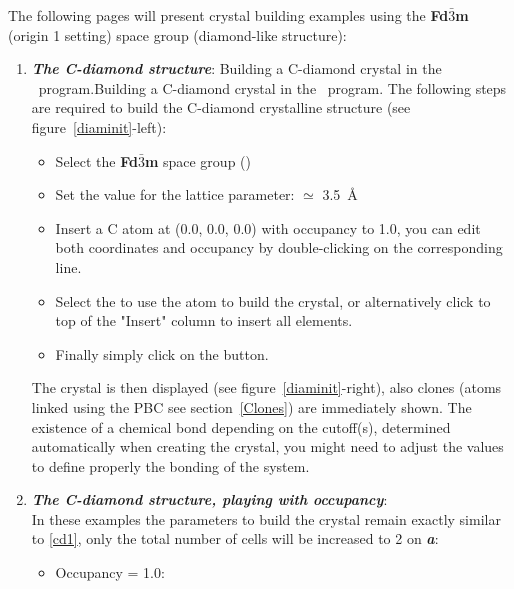 The following pages will present crystal building examples using the {\bf{Fd$\bar{3}$m}} (origin 1 setting) space group (diamond-like structure):\\
\begin{enumerate}
\item\label{cd1} {\bf{\textit{The C-diamond structure}}}:
{Building a C-diamond crystal in the \atomes\ program.}{Building a C-diamond crystal in the \atomes\ program.}
\laf The following steps are required to build the C-diamond crystalline structure (see figure~\ref{diaminit}-left):
\begin{itemize}
\item Select the {\bf{Fd$\bar{3}$m}} space group ()
\item Set the value for the lattice parameter: $\simeq$ 3.5~\AA
\item Insert a C atom at (0.0, 0.0, 0.0) with occupancy to 1.0, you can edit both coordinates and occupancy by double-clicking on the corresponding line.
\item Select the  to use the atom to build the crystal, 
	or alternatively click to top of the "Insert" column to insert all elements.
\item Finally simply click on the  button.
\end{itemize}
The crystal is then displayed (see figure~\ref{diaminit}-right), also clones (atoms linked using the PBC see section~\ref{Clones}) are immediately shown. 
The existence of a chemical bond depending on the cutoff(s), determined automatically when creating the crystal, 
you might need to adjust the values to define properly the bonding of the system. \\
\newpage
\item {\bf{\textit{The C-diamond structure, playing with occupancy}}}:\\
In these examples the parameters to build the crystal remain exactly similar to \ref{cd1}, only the total number of cells will be increased to 2 on {\bf{\textit{a}}}:
\begin{center}\end{center}
\begin{itemize}
\item Occupancy = 1.0: \\
\begin{center}\end{center}

\end{itemize}
\end{enumerate}
